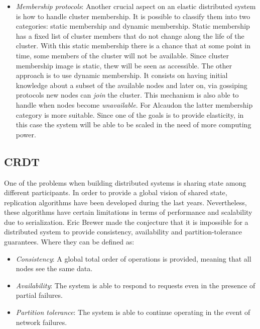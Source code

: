\begin{itemize}
\item \textit{Membership protocols}: Another crucial aspect on an elastic
  distributed system is how to handle cluster membership. It is possible to
  classify them into two categories: static membership and dynamic membership.
  Static membership has a fixed list of cluster members that do not change along
  the life of the cluster. With this static membership there is a chance that at
  some point in time, some members of the cluster will not be available. Since
  cluster membership image is static, thew will be seen as accessible. The other
  approach is to use dynamic membership. It consists on having initial knowledge
  about a subset of the available nodes and later on, via gossiping
  protocols\cite{gossip} new nodes can \textit{join} the cluster. This mechanism
  is also able to handle when nodes become \textit{unavailable}. For Alcaudon
  the latter membership category is more suitable. Since one of the goals is to
  provide elasticity, in this case the system will be able to be scaled in the
  need of more computing power.
\end{itemize}

\subsection{CRDT}

One of the problems when building distributed systems is sharing state among
different participants. In order to provide a global vision of shared state,
replication\cite{book:replication} algorithms have been developed during the last
years. Nevertheless, these algorithms have certain limitations in terms of
performance and scalability due to serialization. Eric Brewer made the
conjecture that it is impossible for a distributed system to provide 
consistency, availability and partition-tolerance guarantees. Where
they can be defined as:

\begin{itemize}
\item \textit{Consistency}: A global total order of operations is provided,
  meaning that all nodes see the same data.
\item \textit{Availability}: The system is able to respond to requests even in
  the presence of partial failures.
\item \textit{Partition tolerance}: The system is able to continue operating in
  the event of network failures.
\end{itemize}

